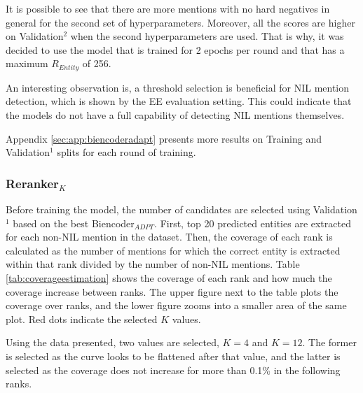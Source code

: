 \documentclass{report}
\theoremstyle{definition}
\theoremstyle{remark}
\begin{document}
It is possible to see that there are more mentions with no hard negatives in general for the second set of hyperparameters. Moreover, all the scores are higher on Validation$^2$ when the second hyperparameters are used. That is why, it was decided to use the model that is trained for 2 epochs per round and that has a maximum $R_{Entity}$ of 256.

An interesting observation is, a threshold selection is beneficial for NIL mention detection, which is shown by the EE evaluation setting. This could indicate that the models do not have a full capability of detecting NIL mentions themselves. 

Appendix \ref{sec:app:biencoderadapt} presents more results on Training and Validation$^1$ splits for each round of training.
\subsubsection{Reranker$_K$}
Before training the model, the number of candidates are selected using Validation$^1$ based on the best Biencoder$_{ADPT}$. First, top 20 predicted entities are extracted for each non-NIL mention in the dataset. Then, the coverage of each rank is calculated as the number of mentions for which the correct entity is extracted within that rank divided by the number of non-NIL mentions. Table \ref{tab:coverageestimation} shows the coverage of each rank and how much the coverage increase between ranks. The upper figure next to the table plots the coverage over ranks, and the lower figure zooms into a smaller area of the same plot. Red dots indicate the selected $K$ values.

Using the data presented, two values are selected, $K=4$ and $K=12$. The former is selected as the curve looks to be flattened after that value, and the latter is selected as the coverage does not increase for more than 0.1\% in the following ranks.
\end{document}

